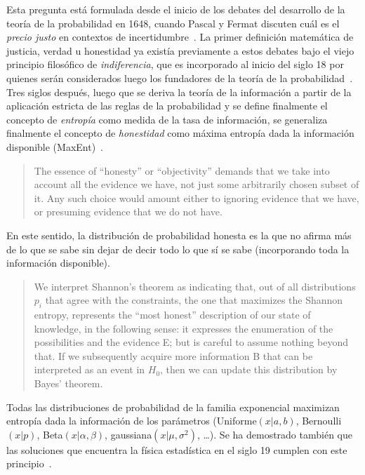 \documentclass[a4paper,11pt]{book}
\theoremstyle{definition}
\begin{document}
Esta pregunta est\'a formulada desde el inicio de los debates del desarrollo de la teor\'ia de la probabilidad en 1648, cuando Pascal y Fermat discuten cu\'al es el \emph{precio justo} en contextos de incertidumbre~\cite{Devlin2008}.
%
La primer definici\'on matem\'atica de justicia, verdad u honestidad ya exist\'ia previamente a estos debates bajo el viejo principio filos\'ofico de \emph{indiferencia}, que es incorporado al inicio del siglo 18 por quienes ser\'an considerados luego los fundadores de la teor\'ia de la probabilidad~\cite{jaynes1984-bayesianBackground}.
%
Tres siglos despu\'es, luego que se deriva la teor\'ia de la informaci\'on a partir de la aplicaci\'on estricta de las reglas de la probabilidad y se define finalmente el concepto de \emph{entrop\'ia} como medida de la tasa de informaci\'on, se generaliza finalmente el concepto de \emph{honestidad} como m\'axima entrop\'ia dada la informaci\'on disponible (MaxEnt)~\cite{Jaynes2003}.
%
\begin{quotation}
The essence of ``honesty'' or ``objectivity'' demands that we take into account all the evidence we have, not just some arbitrarily chosen subset of it. Any such choice would amount either to ignoring evidence that we have, or presuming evidence that we do not have.
\end{quotation}
%
En este sentido, la distribuci\'on de probabilidad honesta es la que no afirma m\'as de lo que se sabe sin dejar de decir todo lo que s\'i se sabe (incorporando toda la informaci\'on disponible).
%
\begin{quotation}
We interpret Shannon's theorem as indicating that, out of all distributions $p_i$ that agree with the constraints, the one that maximizes the Shannon entropy, represents the ``most honest'' description of our state of knowledge, in the following sense: it expresses the enumeration of the possibilities and the evidence E; but is careful to assume nothing beyond that. If we subsequently acquire more information B that can be interpreted as an event in $H_0$, then we can update this distribution by Bayes' theorem. \cite{jaynes1984-bayesianBackground}
\end{quotation}
%
Todas las distribuciones de probabilidad de la familia exponencial maximizan entrop\'ia dada la informaci\'on de los par\'ametros (Uniforme$(x|a,b)$, Bernoulli$(x|p)$, Beta$(x|\alpha, \beta)$, gaussiana$(x|\mu, \sigma^2)$, \dots).
%
Se ha demostrado tambi\'en que las soluciones que encuentra la f\'isica estad\'istica en el siglo 19 cumplen con este principio~\cite{jaynes1957-I, jaynes1957-II}.
\end{document}
